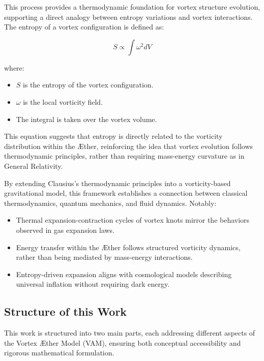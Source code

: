 This process provides a thermodynamic foundation for vortex structure evolution, supporting a direct analogy between entropy variations and vortex interactions.
The entropy of a vortex configuration is defined as:

\begin{equation*} \label{eq:Entropy}
S \propto \int \omega^2 dV
\end{equation*}

where:

\begin{itemize}
    \item \( S \) is the entropy of the vortex configuration.
    \item \( \omega \)  is the local vorticity field.
    \item The integral is taken over the vortex volume.
\end{itemize}

This equation suggests that entropy is directly related to the vorticity distribution within the Æther, reinforcing the idea that vortex evolution follows thermodynamic principles, rather than requiring mass-energy curvature as in General Relativity.

By extending Clausius’s thermodynamic principles into a vorticity-based gravitational model, this framework establishes a connection between classical thermodynamics, quantum mechanics, and fluid dynamics. Notably:

\begin{itemize}
    \item Thermal expansion-contraction cycles of vortex knots mirror the behaviors observed in gas expansion laws.
    \item Energy transfer within the Æther follows structured vorticity dynamics, rather than being mediated by mass-energy interactions.
    \item Entropy-driven expansion aligns with cosmological models describing universal inflation without requiring dark energy.
\end{itemize}

\subsection*{Structure of this Work}

This work is structured into two main parts, each addressing different aspects of the Vortex Æther Model (VAM), ensuring both conceptual accessibility and rigorous mathematical formulation.

